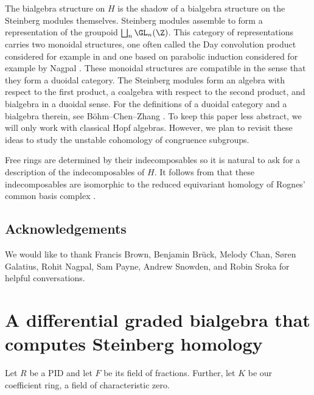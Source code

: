 \begin{remark}
The bialgebra structure on $H$ is the shadow of a bialgebra structure on the Steinberg modules themselves. Steinberg modules assemble to form a representation of the groupoid $\bigsqcup_n \GL_n(\Z)$. This category of representations carries two monoidal structures, one often called the Day convolution product considered for example in \cite{MNP} and one based on parabolic induction considered for example by Nagpal \cite{VIpart1}. These monoidal structures are compatible in the sense that they form a duoidal category. The Steinberg modules form an algebra with respect to the first product, a coalgebra with respect to the second product, and bialgebra in a duoidal sense. For the definitions of a duoidal category and a bialgebra therein, see B\"ohm--Chen--Zhang \cite{duoidalcat}. To keep this paper less abstract, we will only work with classical Hopf algebras. However, we plan to revisit these ideas to study the unstable cohomology of congruence subgroups.

\end{remark}

\begin{remark}
Free rings are determined by their indecomposables so it is natural to ask for a description of the indecomposables of $H$. It follows from \cite[Remark 1.6]{MPW} that these indecomposables are isomorphic to the reduced equivariant homology of Rognes' common basis complex \cite{Rog}.

\end{remark}

\subsection*{Acknowledgements}

We would like to thank Francis Brown, Benjamin Br\"uck, Melody Chan, S\o{}ren Galatius, Rohit Nagpal, Sam Payne, Andrew Snowden, and Robin Sroka for helpful conversations.






\section{A differential graded bialgebra that computes Steinberg homology}

Let $R$ be a PID and let $F$ be its field of fractions. Further, let $K$ be our coefficient ring, a field of characteristic zero.

